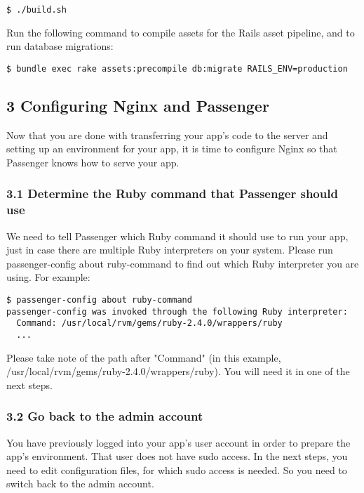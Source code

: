 \documentclass[11pt]{article}
\begin{document}
\begin{verbatim}
$ ./build.sh
\end{verbatim}

Run the following command to compile assets for the Rails asset pipeline, and to run database migrations:
\begin{verbatim}
$ bundle exec rake assets:precompile db:migrate RAILS_ENV=production
\end{verbatim}

\subsection{3 Configuring Nginx and Passenger}
\label{sec:org7dc57a0}

Now that you are done with transferring your app's code to the server and setting up an environment for your app, it is time to configure Nginx so that Passenger knows how to serve your app.

\subsubsection{3.1 Determine the Ruby command that Passenger should use}
\label{sec:orga75a9bd}

We need to tell Passenger which Ruby command it should use to run your app, just in case there are multiple Ruby interpreters on your system. Please run passenger-config about ruby-command to find out which Ruby interpreter you are using. For example:

\begin{verbatim}
$ passenger-config about ruby-command
passenger-config was invoked through the following Ruby interpreter:
  Command: /usr/local/rvm/gems/ruby-2.4.0/wrappers/ruby
  ...
\end{verbatim}

Please take note of the path after "Command" (in this example, /usr/local/rvm/gems/ruby-2.4.0/wrappers/ruby). You will need it in one of the next steps.

\subsubsection{3.2 Go back to the admin account}
\label{sec:org684edea}

You have previously logged into your app's user account in order to prepare the app's environment. That user does not have sudo access. In the next steps, you need to edit configuration files, for which sudo access is needed. So you need to switch back to the admin account.
\end{document}
